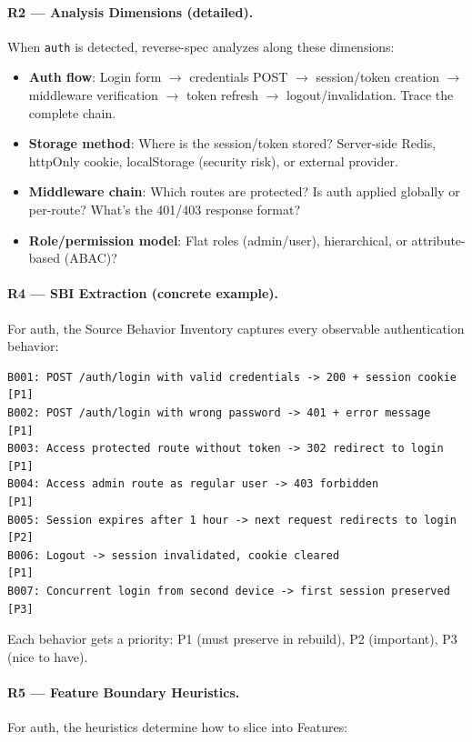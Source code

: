 \documentclass[11pt,a4paper,openright,twoside]{report}
\begin{document}
\paragraph{R2 --- Analysis Dimensions (detailed).}
When \texttt{auth} is detected, reverse-spec analyzes along these dimensions:

\begin{itemize}[nosep]
  \item \textbf{Auth flow}: Login form $\rightarrow$ credentials POST $\rightarrow$ session/token creation $\rightarrow$ middleware verification $\rightarrow$ token refresh $\rightarrow$ logout/invalidation. Trace the complete chain.
  \item \textbf{Storage method}: Where is the session/token stored? Server-side Redis, httpOnly cookie, localStorage (security risk), or external provider.
  \item \textbf{Middleware chain}: Which routes are protected? Is auth applied globally or per-route? What's the 401/403 response format?
  \item \textbf{Role/permission model}: Flat roles (admin/user), hierarchical, or attribute-based (ABAC)?
\end{itemize}

\paragraph{R4 --- SBI Extraction (concrete example).}
For auth, the Source Behavior Inventory captures every observable authentication behavior:

\begin{lstlisting}
B001: POST /auth/login with valid credentials -> 200 + session cookie  [P1]
B002: POST /auth/login with wrong password -> 401 + error message      [P1]
B003: Access protected route without token -> 302 redirect to login    [P1]
B004: Access admin route as regular user -> 403 forbidden              [P1]
B005: Session expires after 1 hour -> next request redirects to login  [P2]
B006: Logout -> session invalidated, cookie cleared                    [P1]
B007: Concurrent login from second device -> first session preserved   [P3]
\end{lstlisting}

Each behavior gets a priority: P1 (must preserve in rebuild), P2 (important), P3 (nice to have).

\paragraph{R5 --- Feature Boundary Heuristics.}
For auth, the heuristics determine how to slice into Features:
\end{document}
